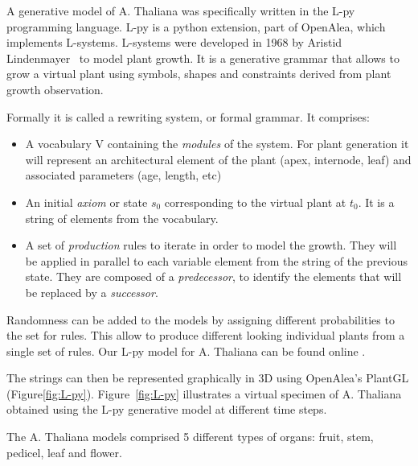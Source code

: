 A generative model of A. Thaliana was specifically
written in the L-py programming language. L-py is a python extension,
part of OpenAlea, which implements L-systems. L-systems were developed
in 1968 by Aristid Lindenmayer~\cite{prusinkiewicz2012algorithmic}
to model plant growth.  It is a generative grammar that allows to
grow a virtual plant using symbols, shapes and constraints derived
from plant growth observation.

Formally it is called a rewriting system, or formal grammar. It
comprises:

\begin{itemize}
    \item A vocabulary V containing the \emph{modules} of the
    system. For plant generation it will represent an architectural
    element of the plant (apex, internode, leaf) and associated
    parameters (age, length, etc) \item An initial \emph{axiom}
    or state $s_0$ corresponding to the virtual plant at $t_0$. It
    is a string of elements from the vocabulary.  \item A set
    of \emph{production} rules to iterate in order to model
    the growth. They will be applied in parallel to each variable
    element from the string of the previous state. They are composed
    of a \emph{predecessor}, to identify the elements that will be
    replaced by a \emph{successor}.
\end{itemize}

Randomness can be added to the models by assigning different
probabilities to the set for rules. This allow to produce different
looking individual plants from a single set of rules. Our L-py model
for A. Thaliana can be found online \cite{Lpy_godin}.

The strings can then be represented graphically in 3D using OpenAlea's
PlantGL (Figure\ref{fig:L-py}). Figure~\ref{fig:L-py} illustrates a virtual specimen
of A. Thaliana obtained using the L-py generative model at different time steps.

The A. Thaliana models comprised 5 different types of organs: fruit, stem, pedicel, leaf and flower.

